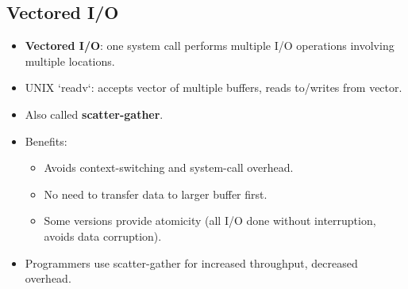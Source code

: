 \subsection{Vectored I/O}
\begin{itemize}
    \item \textbf{Vectored I/O}: one system call performs multiple I/O operations involving multiple locations.
    \item UNIX `readv`: accepts vector of multiple buffers, reads to/writes from vector.
    \item Also called \textbf{scatter-gather}.
    \item Benefits:
    \begin{itemize}
        \item Avoids context-switching and system-call overhead.
        \item No need to transfer data to larger buffer first.
        \item Some versions provide atomicity (all I/O done without interruption, avoids data corruption).
    \end{itemize}
    \item Programmers use scatter-gather for increased throughput, decreased overhead.
\end{itemize}

